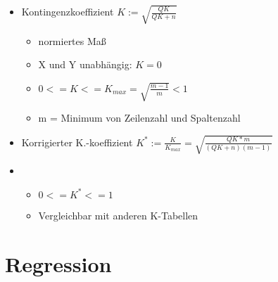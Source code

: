\documentclass[a4paper]{article}
\begin{document}
\begin{landscape}
\begin{multicols}{4}
\begin{itemize}[noitemsep,nolistsep,leftmargin=*]
\begin{itemize}[noitemsep,nolistsep,leftmargin=*]
        \end{itemize}
        \item Kontingenzkoeffizient $K := \sqrt{\frac{QK}{QK+n}}$
        \begin{itemize}[noitemsep,nolistsep,leftmargin=*]
            \item normiertes Maß
            \item X und Y unabhängig: $K = 0$
            \item $0 <= K <= K_{max} = \sqrt{\frac{m-1}{m}} < 1$
            \item m = Minimum von Zeilenzahl und Spaltenzahl
        \end{itemize}
        \item Korrigierter K.-koeffizient $K^* := \frac{K}{K_{max}} = \sqrt{\frac{QK*m}{(QK+n)(m-1)}}$
        \item \begin{itemize}[noitemsep,nolistsep,leftmargin=*]
            \item $ 0 <= K^* <= 1$
            \item Vergleichbar mit anderen K-Tabellen
        \end{itemize}
    \end{itemize}


  




    \section{Regression}


\end{multicols}
\end{landscape}
\end{document}

